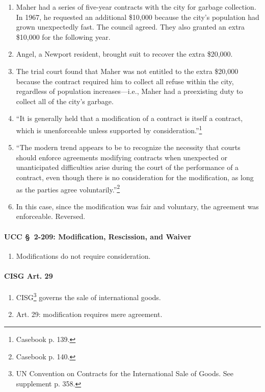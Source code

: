 \begin{enumerate}
    \item Maher had a series of five-year contracts with the city for garbage 
    collection. In 1967, he requested an additional \$10,000 because the 
    city's population had grown unexpectedly fast. The council agreed. They 
    also granted an extra \$10,000 for the following year.
    \item Angel, a Newport resident, brought suit to recover the extra 
    \$20,000.
    \item The trial court found that Maher was not entitled to the extra 
    \$20,000 because the contract required him to collect all refuse within 
    the city, regardless of population increases---i.e., Maher had a 
    preexisting duty to collect all of the city's garbage.
    \item ``It is generally held that a modification of a contract is itself a 
    contract, which is unenforceable unless supported by 
    consideration.''\footnote{Casebook p. 139.}
    \item ``The modern trend appears to be to recognize the necessity that 
    courts should enforce agreements modifying contracts when unexpected or 
    unanticipated difficulties arise during the court of the performance of a 
    contract, even though there is no consideration for the modification, as 
    long as the parties agree voluntarily.''\footnote{Casebook p. 140.}
    \item In this case, since the modification was fair and voluntary, the 
    agreement was enforceable. Reversed.
\end{enumerate}

\paragraph{UCC \S\ 2-209: Modification, Rescission, and Waiver}

\begin{enumerate}
    \item Modifications do not require consideration.
\end{enumerate}

\paragraph{CISG Art. 29}

\begin{enumerate}
    \item CISG\footnote{UN Convention on Contracts for the International Sale 
    of Goods. See supplement p. 358.} governs the sale of international goods.
    \item Art. 29: modification requires mere agreement.
\end{enumerate}

